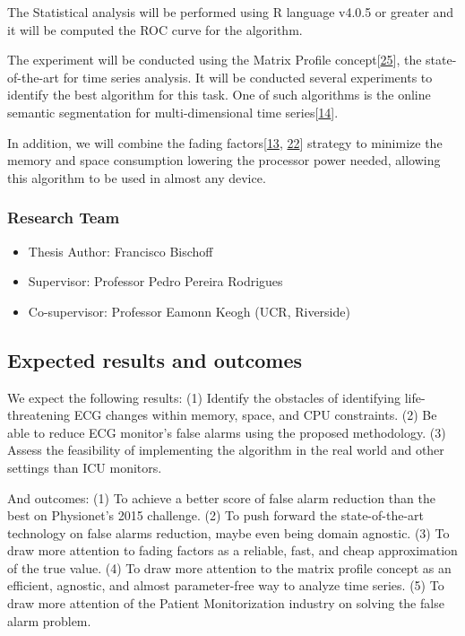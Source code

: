 \documentclass[runningheads]{llncs}
\providecommand{\tightlist}{%
  \setlength{\itemsep}{0pt}\setlength{\parskip}{0pt}}
\begin{document}
The Statistical analysis will be performed using R language v4.0.5 or
greater and it will be computed the ROC curve for the algorithm.

The experiment will be conducted using the Matrix Profile
concept{[}\protect\hyperlink{ref-yeh2016}{25}{]}, the state-of-the-art
for time series analysis. It will be conducted several experiments to
identify the best algorithm for this task. One of such algorithms is the
online semantic segmentation for multi-dimensional time
series{[}\protect\hyperlink{ref-gharghabi2018}{14}{]}.

In addition, we will combine the fading
factors{[}\protect\hyperlink{ref-Gama2013}{13},
\protect\hyperlink{ref-Rodrigues2010}{22}{]} strategy to minimize the
memory and space consumption lowering the processor power needed,
allowing this algorithm to be used in almost any device.

\hypertarget{research-team}{%
\subsubsection{Research Team}\label{research-team}}

\begin{itemize}
\tightlist
\item
  Thesis Author: Francisco Bischoff
\item
  Supervisor: Professor Pedro Pereira Rodrigues
\item
  Co-supervisor: Professor Eamonn Keogh (UCR, Riverside)
\end{itemize}

\hypertarget{expected-results-and-outcomes}{%
\subsection{Expected results and
outcomes}\label{expected-results-and-outcomes}}

We expect the following results: (1) Identify the obstacles of
identifying life-threatening ECG changes within memory, space, and CPU
constraints. (2) Be able to reduce ECG monitor's false alarms using the
proposed methodology. (3) Assess the feasibility of implementing the
algorithm in the real world and other settings than ICU monitors.

And outcomes: (1) To achieve a better score of false alarm reduction
than the best on Physionet's 2015 challenge. (2) To push forward the
state-of-the-art technology on false alarms reduction, maybe even being
domain agnostic. (3) To draw more attention to fading factors as a
reliable, fast, and cheap approximation of the true value. (4) To draw
more attention to the matrix profile concept as an efficient, agnostic,
and almost parameter-free way to analyze time series. (5) To draw more
attention of the Patient Monitorization industry on solving the false
alarm problem.
\end{document}
